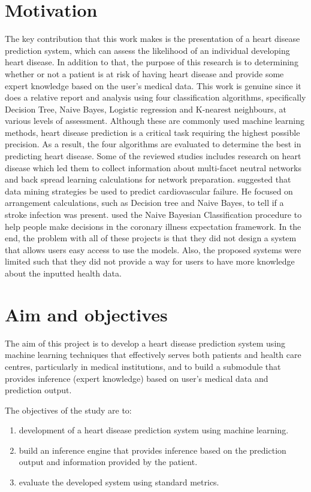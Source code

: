 \section{Motivation}
The key contribution that this work makes is the presentation of a heart disease prediction system, which can assess the likelihood of an individual developing heart disease. In addition to that, the purpose of this research is to determining whether or not a patient is at risk of having heart disease and provide some expert knowledge based on the user's medical data. This work is genuine since it does a relative report and analysis using four classification algorithms, specifically Decision Tree, Naive Bayes, Logistic regression and K-nearest neighbours, at various levels of assessment. Although these are commonly used machine learning methods, heart disease prediction is a critical task requiring the highest possible precision. As a result, the four algorithms are evaluated to determine the best in predicting heart disease. Some of the reviewed studies includes
 research on heart disease which led them to collect information about multi-facet neutral networks and back spread learning calculations for network preparation. \cite{srinivas2010applications} suggested that data mining strategies be used to predict cardiovascular failure. He focused on arrangement calculations, such as Decision tree and Naive Bayes, to tell if a stroke infection was present. \cite{pattekari2012prediction} used the Naive Bayesian Classification procedure to help people make decisions in the coronary illness expectation framework. In the end, the problem with all of these projects is that they did not design a system that allows users easy access to use the models. Also, the proposed systems were limited such that they did not provide a way for users to have more knowledge about the inputted health data.

\section{Aim and objectives}
The aim of this project is to develop a heart disease prediction system using machine learning techniques that effectively serves both patients and health care centres, particularly in medical institutions, and to build a submodule that provides inference (expert knowledge) based on user's medical data and prediction output. 

The objectives of the study are to:
\begin{enumerate}[label=(\alph*)]
	\item  development of a heart disease prediction system using machine learning.
	\item build an inference engine that provides inference based on the prediction output and information provided by the patient.
	\item evaluate the developed system using standard metrics.
\end{enumerate}

